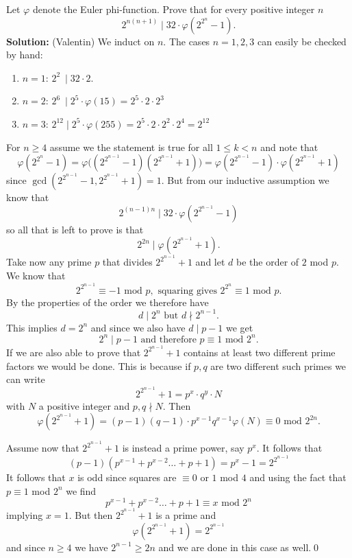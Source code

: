 Let $\varphi$ denote the Euler phi-function. Prove that for every positive integer $n$
$$2^{n(n+1)}\mid 32\cdot\varphi\left(2^{2^n}-1\right).$$
\textbf{Solution:} (Valentin)
We induct on $n$. The cases $n = 1,2,3$ can easily be checked by hand:
\begin{enumerate}[label=$\bullet$]
\item $n = 1$: $2^2\ \mid 32\cdot2$.
\item $n = 2$: $2^6\ \mid 2^5\cdot\varphi(15) = 2^5\cdot2\cdot2^3$
\item $n = 3$: $2^{12}\mid 2^5\cdot\varphi(255) = 2^5\cdot2\cdot2^2\cdot2^4=2^{12}$
\end{enumerate}

For $n \geq 4$ assume we the statement is true for all $1\leq k < n$ and note that
$$\varphi\left(2^{2^n}-1\right)=\varphi\bigg(\left(2^{2^{n-1}}-1\right)\left(2^{2^{n-1}}+1\right)\bigg) = \varphi\left(2^{2^{n-1}}-1\right)\cdot\varphi\left(2^{2^{n-1}}+1\right)$$
since $\gcd(2^{2^{n-1}}-1,2^{2^{n-1}}+1) = 1$. But from our inductive assumption we know that $$2^{(n-1)n}\mid32\cdot\varphi\left(2^{2^{n-1}}-1\right)$$
so all that is left to prove is that
$$2^{2n}\mid\varphi\left(2^{2^{n-1}}+1\right).$$
Take now any prime $p$ that divides $2^{2^{n-1}}+1$ and let $d$ be the order of $2$ mod $p$. We know that
$$2^{2^{n-1}} \equiv -1 \text{ mod }p, \text{ squaring gives } 2^{2^n} \equiv 1 \text{ mod }p.$$
By the properties of the order we therefore have
$$d\mid 2^n \text{ but } d\nmid 2^{n-1}.$$
This implies $d = 2^n$ and since we also have $d\mid p-1$ we get
$$2^n\mid p-1 \text{ and therefore } p \equiv 1 \text{ mod } 2^n.$$
If we are also able to prove that $2^{2^{n-1}}+1$ contains at least two different prime factors we would be done. This is because if $p,q$ are two different such primes we can write
$$2^{2^{n-1}}+1 = p^x\cdot q^y\cdot N$$
with $N$ a positive integer and $p,q\nmid N$. Then
$$\varphi\left(2^{2^{n-1}}+1\right)=(p-1)(q-1)\cdot p^{x-1}q^{x-1}\varphi(N) \equiv 0 \text{ mod } 2^{2n}.$$

Assume now that $2^{2^{n-1}}+1$ is instead a prime power, say $p^x$. It follows that
$$(p-1)\left(p^{x-1}+p^{x-2}\ldots+p+1\right) = p^x-1 = 2^{2^{n-1}}$$
It follows that $x$ is odd since squares are $\equiv 0$ or $1$ mod $4$ and using the fact that $p\equiv 1$ mod $2^n$ we find
$$p^{x-1}+p^{x-2}\ldots+p+1 \equiv x \text{ mod } 2^n$$
implying $x = 1$. But then $2^{2^{n-1}}+1$ is a prime and
$$\varphi\left(2^{2^{n-1}}+1\right) = 2^{2^{n-1}}$$
and since $n\geq 4$ we have $2^{n-1}\geq 2n$ and we are done in this case as well.\qed

